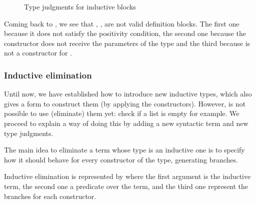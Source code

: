 \begin{figure}
    \centering
    \caption{Type judgments for inductive blocks}
    \label{fig:CIC-Ind-rules}
\end{figure}


Coming back to , we see that \IndbadOne{}, \IndbadTwo{}, \IndbadThree{}
are not valid definition blocks. The first one because it does not satisfy the positivity condition,
the second one because the constructor does not receive the parameters of the type and the third because
 is not a constructor for \IndbadThree{}.


\subsubsection{Inductive elimination}
\newcommand{\PredN}{\ensuremath{Q}} 
\newcommand{\CicIndElim}{\textsc{Ind-Elim}}

Until now, we have established how to introduce new inductive types, which also gives a form to construct them 
(by applying the constructors). However, is not possible to use (eliminate) them yet: check if a list is empty for 
example. We proceed to explain a way of doing this by adding a new syntactic term and new type judgments.

The main idea to eliminate a term whose type is an inductive one is to specify how it should behave for every 
constructor of the type, generating branches.
\begin{Definition}
Inductive elimination is represented by \IndElim{\cdot}{\cdot}{\cdot|\dots |\cdot} where
the first argument is the inductive term, the second one a predicate over the term, and the third one represent
the branches for each constructor.
\end{Definition}

